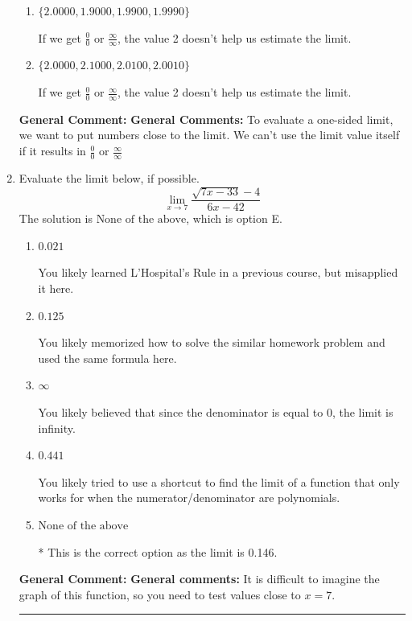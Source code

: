 \documentclass{extbook}[14pt]
\newcommand{\litem}[1]{\item #1

\rule{\textwidth}{0.4pt}}
\begin{document}
\begin{enumerate}
{\begin{enumerate}[label=\Alph*.]
These values would estimate the limit of 2 on the left.
\item \( \{ 2.0000, 1.9000, 1.9900, 1.9990 \} \)

If we get $\frac{0}{0}$ or $\frac{\infty}{\infty}$, the value 2 doesn't help us estimate the limit.
\item \( \{ 2.0000, 2.1000, 2.0100, 2.0010 \} \)

If we get $\frac{0}{0}$ or $\frac{\infty}{\infty}$, the value 2 doesn't help us estimate the limit.
\end{enumerate}

\textbf{General Comment:} \textbf{General Comments:} To evaluate a one-sided limit, we want to put numbers close to the limit. We can't use the limit value itself if it results in $\frac{0}{0}$ or $\frac{\infty}{\infty}$
}
\litem{
Evaluate the limit below, if possible.
\[ \lim_{x \rightarrow 7} \frac{\sqrt{7x - 33} - 4}{6x - 42} \]The solution is \( \text{None of the above} \), which is option E.\begin{enumerate}[label=\Alph*.]
\item \( 0.021 \)

You likely learned L'Hospital's Rule in a previous course, but misapplied it here.
\item \( 0.125 \)

You likely memorized how to solve the similar homework problem and used the same formula here.
\item \( \infty \)

You likely believed that since the denominator is equal to 0, the limit is infinity.
\item \( 0.441 \)

You likely tried to use a shortcut to find the limit of a function that only works for when the numerator/denominator are polynomials.
\item \( \text{None of the above} \)

* This is the correct option as the limit is 0.146.
\end{enumerate}

\textbf{General Comment:} \textbf{General comments:} It is difficult to imagine the graph of this function, so you need to test values close to $x = 7$.
}
\end{enumerate}
\end{document}
